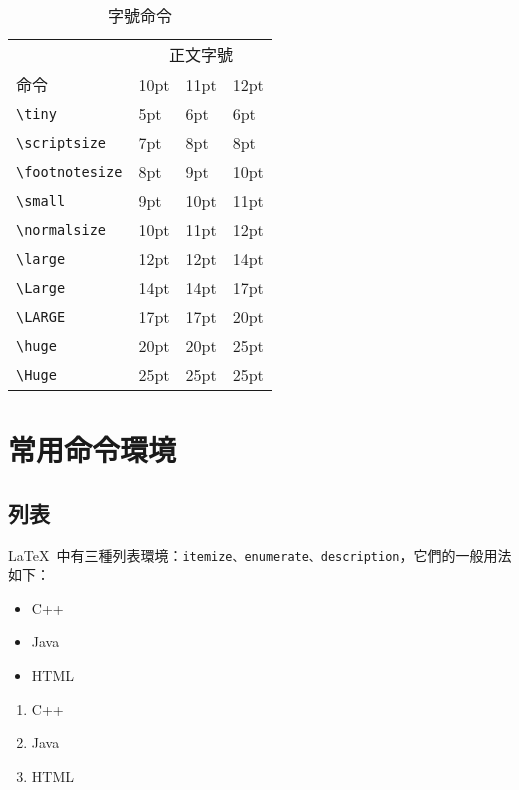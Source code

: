 \begin{table}[htbp]
\centering
\caption{字號命令}
\label{tab:fontsize_command}
\begin{tabular}{llll}
    \toprule
    & \multicolumn{3}{c}{正文字號} \\
    \cmidrule(lr){2-4}
    命令 & 10pt & 11pt & 12pt \\
    \midrule
    \verb|\tiny|         & 5pt  & 6pt  & 6pt \\
    \verb|\scriptsize|   & 7pt  & 8pt  & 8pt \\
    \verb|\footnotesize| & 8pt  & 9pt  & 10pt \\
    \verb|\small|        & 9pt  & 10pt & 11pt \\
    \verb|\normalsize|   & 10pt & 11pt & 12pt \\
    \verb|\large|        & 12pt & 12pt & 14pt \\
    \verb|\Large|        & 14pt & 14pt & 17pt \\
    \verb|\LARGE|        & 17pt & 17pt & 20pt \\
    \verb|\huge|         & 20pt & 20pt & 25pt \\
    \verb|\Huge|         & 25pt & 25pt & 25pt \\
    \bottomrule
\end{tabular}
\end{table}

\section{常用命令環境}
\subsection{列表}

\LaTeX~中有三種列表環境：\verb|itemize、enumerate、description|，它們的一般用法如下：

\begin{demo}
\begin{itemize}
    \item C++
    \item Java
    \item HTML
\end{itemize}
\end{demo}

\begin{demo}
\begin{enumerate}
    \item C++
    \item Java
    \item HTML
\end{enumerate}
\end{demo}

